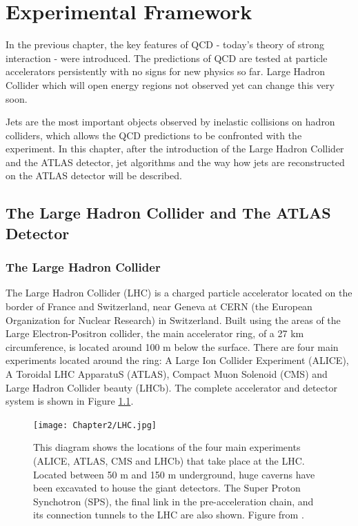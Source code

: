 \chapter{Experimental Framework}


In the previous chapter, the key features of QCD - today's theory of strong
interaction - were introduced. The predictions of QCD are tested at particle
accelerators persistently with no signs for new physics so far. Large Hadron
Collider which will open energy regions not observed yet can change this very
soon.

Jets are the most important objects observed by inelastic collisions on hadron
colliders, which allows the QCD predictions to be confronted with the
experiment. In this chapter, after the introduction of the Large Hadron Collider
and the ATLAS detector, jet algorithms and the way how jets are reconstructed on
the ATLAS detector will be described.

\section{The Large Hadron Collider and The ATLAS Detector}

\subsection{The Large Hadron Collider}

The Large Hadron Collider (LHC) \cite{LHC, LHCPastPresentFuture} is a charged
particle accelerator located on the border of France and Switzerland, near
Geneva at CERN (the European Organization for Nuclear Research) in Switzerland.
Built using the areas of the Large Electron-Positron collider, the main
accelerator ring, of a 27 km circumference, is located around 100 m below the
surface. There are four main experiments located around the ring: A Large Ion
Collider Experiment (ALICE), A Toroidal LHC ApparatuS (ATLAS), Compact Muon
Solenoid (CMS) and Large Hadron Collider beauty (LHCb). The complete accelerator
and detector system is shown in Figure \ref{fig:LHC}.

\begin{figure}[t]
  \centering
  \texttt{[image: Chapter2/LHC.jpg]}
  \caption{This diagram shows the locations of the four main experiments (ALICE,
    ATLAS, CMS and LHCb) that take place at the LHC. Located between 50 m and
    150 m underground, huge caverns have been excavated to house the giant
    detectors. The Super Proton Synchotron (SPS), the final link in the
    pre-acceleration chain, and its connection tunnels to the LHC are also
    shown.  Figure from \cite{CERN:ATLASexperimentPictureswiki}.  }
  \label{fig:LHC}
\end{figure}

